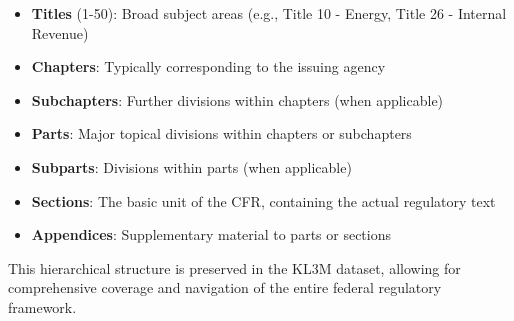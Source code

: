 \begin{itemize}
  \item \textbf{Titles} (1-50): Broad subject areas (e.g., Title 10 - Energy, Title 26 - Internal Revenue)
  \item \textbf{Chapters}: Typically corresponding to the issuing agency
  \item \textbf{Subchapters}: Further divisions within chapters (when applicable)
  \item \textbf{Parts}: Major topical divisions within chapters or subchapters
  \item \textbf{Subparts}: Divisions within parts (when applicable)
  \item \textbf{Sections}: The basic unit of the CFR, containing the actual regulatory text
  \item \textbf{Appendices}: Supplementary material to parts or sections
\end{itemize}

This hierarchical structure is preserved in the KL3M dataset, allowing for comprehensive coverage and navigation of the entire federal regulatory framework.
